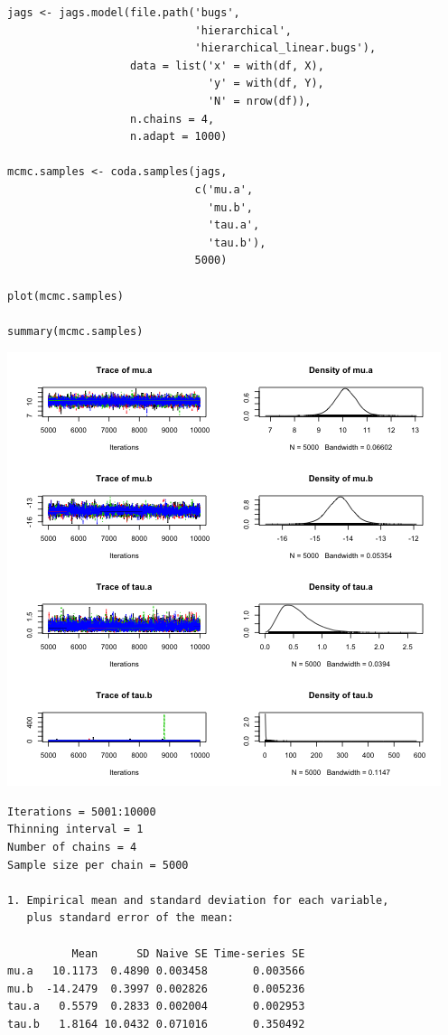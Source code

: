 \documentclass{beamer}
\begin{document}
\begin{frame}[fragile]
  \begin{verbatim}
jags <- jags.model(file.path('bugs',
                             'hierarchical',
                             'hierarchical_linear.bugs'),
                   data = list('x' = with(df, X),
                               'y' = with(df, Y),
                               'N' = nrow(df)),
                   n.chains = 4,
                   n.adapt = 1000)
 
mcmc.samples <- coda.samples(jags,
                             c('mu.a',
                               'mu.b',
                               'tau.a',
                               'tau.b'),
                             5000)

plot(mcmc.samples)

summary(mcmc.samples)
  \end{verbatim}
\end{frame}

\begin{frame}[fragile]
  \begin{center}
    \includegraphics[scale = 0.4]{../graphs/hierarchical/linear_plot1.png}
  \end{center}
\end{frame}

\begin{frame}[fragile]
  \begin{verbatim}
Iterations = 5001:10000
Thinning interval = 1 
Number of chains = 4 
Sample size per chain = 5000 

1. Empirical mean and standard deviation for each variable,
   plus standard error of the mean:

          Mean      SD Naive SE Time-series SE
mu.a   10.1173  0.4890 0.003458       0.003566
mu.b  -14.2479  0.3997 0.002826       0.005236
tau.a   0.5579  0.2833 0.002004       0.002953
tau.b   1.8164 10.0432 0.071016       0.350492
  \end{verbatim}
\end{frame}
\end{document}

